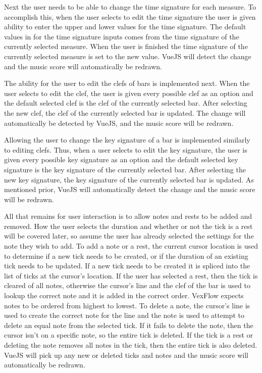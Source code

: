 \documentclass[letterpaper,12pt]{article}
\begin{document}
Next the user needs to be able to change the time signature for each measure. To accomplish this, when the user selects
to edit the time signature the user is given ability to enter the upper and lower values for the time signature. The
default values in for the time signature inputs comes from the time signature of the currently selected measure. When
the user is finished the time signature of the currently selected measure is set to the new value. VueJS will detect the
change and the music score will automatically be redrawn.

The ability for the user to edit the clefs of bars is implemented next. When the user selects to edit the clef, the
user is given every possible clef as an option and the default selected clef is the clef of the currently selected bar.
After selecting the new clef, the clef of the currently selected bar is updated. The change will automatically be
detected by VueJS, and the music score will be redrawn.

Allowing the user to change the key signature of a bar is implemented similarly to editing clefs. Thus, when a user
selects to edit the key signature, the user is given every possible key signature as an option and the default selected
key signature is the key signature of the currently selected bar. After selecting the new key signature, the key
signature of the currently selected bar is updated. As mentioned prior, VueJS will automatically detect the change and
the music score will be redrawn.

All that remains for user interaction is to allow notes and rests to be added and removed. How the user selects the
duration and whether or not the tick is a rest will be covered later, so assume the user has already selected the
settings for the note they wish to add. To add a note or a rest, the current cursor location is used to determine if a
new tick needs to be created, or if the duration of an existing tick needs to be updated. If a new tick needs to be
created it is spliced into the list of ticks at the cursor's location. If the user has selected a rest, then the tick
is cleared of all notes, otherwise the cursor's line and the clef of the bar is used to lookup the correct note and it
is added in the correct order. VexFlow expects notes to be ordered from highest to lowest. To delete a note, the
cursor's line is used to create the correct note for the line and the note is used to attempt to delete an equal note
from the selected tick. If it fails to delete the note, then the cursor isn't on a specific note, so the entire tick is
deleted. If the tick is a rest or deleting the note removes all notes in the tick, then the entire tick is also deleted.
VueJS will pick up any new or deleted ticks and notes and the music score will automatically be redrawn.
\end{document}
